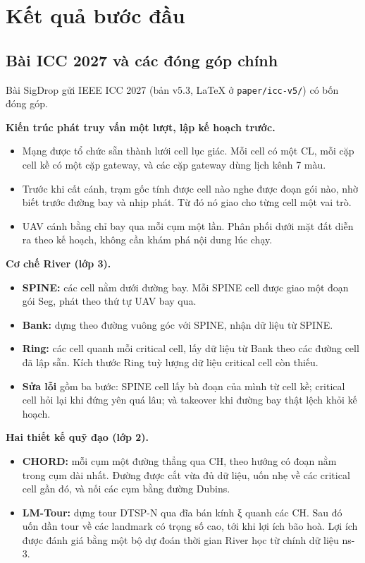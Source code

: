 \section{Kết quả bước đầu}

\subsection{Bài ICC 2027 và các đóng góp chính}

Bài SigDrop gửi IEEE ICC 2027 (bản v5.3, LaTeX ở \texttt{paper/icc-v5/})
có bốn đóng góp.

\textbf{Kiến trúc phát truy vấn một lượt, lập kế hoạch trước.}

\begin{itemize}
\tightlist
\item
  Mạng được tổ chức sẵn thành lưới cell lục giác. Mỗi cell có một CL,
  mỗi cặp cell kề có một cặp gateway, và các cặp gateway dùng lịch kênh
  7 màu.
\item
  Trước khi cất cánh, trạm gốc tính được cell nào nghe được đoạn gói
  nào, nhờ biết trước đường bay và nhịp phát. Từ đó nó giao cho từng
  cell một vai trò.
\item
  UAV cánh bằng chỉ bay qua mỗi cụm một lần. Phân phối dưới mặt đất diễn
  ra theo kế hoạch, không cần khám phá nội dung lúc chạy.
\end{itemize}

\textbf{Cơ chế River (lớp 3).}

\begin{itemize}
\tightlist
\item
  \textbf{SPINE:} các cell nằm dưới đường bay. Mỗi SPINE cell được giao
  một đoạn gói Seg, phát theo thứ tự UAV bay qua.
\item
  \textbf{Bank:} dựng theo đường vuông góc với SPINE, nhận dữ liệu từ
  SPINE.
\item
  \textbf{Ring:} các cell quanh mỗi critical cell, lấy dữ liệu từ Bank
  theo các đường cell đã lập sẵn. Kích thước Ring tuỳ lượng dữ liệu
  critical cell còn thiếu.
\item
  \textbf{Sửa lỗi} gồm ba bước: SPINE cell lấy bù đoạn của mình từ cell
  kề; critical cell hỏi lại khi đứng yên quá lâu; và takeover khi đường
  bay thật lệch khỏi kế hoạch.
\end{itemize}

\textbf{Hai thiết kế quỹ đạo (lớp 2).}

\begin{itemize}
\tightlist
\item
  \textbf{CHORD:} mỗi cụm một đường thẳng qua CH, theo hướng có đoạn nằm
  trong cụm dài nhất. Đường được cắt vừa đủ dữ liệu, uốn nhẹ về các
  critical cell gần đó, và nối các cụm bằng đường Dubins.
\item
  \textbf{LM-Tour:} dựng tour DTSP-N qua đĩa bán kính ξ quanh các CH.
  Sau đó uốn dần tour về các landmark có trọng số cao, tới khi lợi ích
  bão hoà. Lợi ích được đánh giá bằng một bộ dự đoán thời gian River học
  từ chính dữ liệu ns-3.
\end{itemize}


